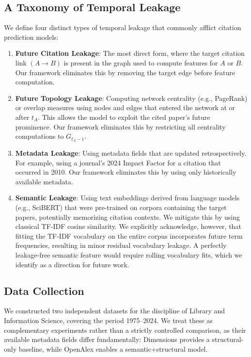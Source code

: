 \documentclass[11pt,a4paper]{article}
\begin{document}
\subsection{A Taxonomy of Temporal Leakage}
We define four distinct types of temporal leakage that commonly afflict citation prediction models:

\begin{enumerate}
    \item \textbf{Future Citation Leakage}: The most direct form, where the target citation link $(A \to B)$ is present in the graph used to compute features for $A$ or $B$. Our framework eliminates this by removing the target edge before feature computation.
    \item \textbf{Future Topology Leakage}: Computing network centrality (e.g., PageRank) or overlap measures using nodes and edges that entered the network at or after $t_A$. This allows the model to exploit the cited paper's future prominence. Our framework eliminates this by restricting all centrality computations to $G_{t_A-1}$.
    \item \textbf{Metadata Leakage}: Using metadata fields that are updated retrospectively. For example, using a journal's 2024 Impact Factor for a citation that occurred in 2010. Our framework eliminates this by using only historically available metadata.
    \item \textbf{Semantic Leakage}: Using text embeddings derived from language models (e.g., SciBERT) that were pre-trained on corpora containing the target papers, potentially memorizing citation contexts. We mitigate this by using classical TF-IDF cosine similarity. We explicitly acknowledge, however, that fitting the TF-IDF vocabulary on the entire corpus incorporates future term frequencies, resulting in minor residual vocabulary leakage. A perfectly leakage-free semantic feature would require rolling vocabulary fits, which we identify as a direction for future work.
\end{enumerate}

\subsection{Data Collection}
We constructed two independent datasets for the discipline of Library and Information Science, covering the period 1975--2024. We treat these as complementary experiments rather than a strictly controlled comparison, as their available metadata fields differ fundamentally: Dimensions provides a structural-only baseline, while OpenAlex enables a semantic+structural model.
\end{document}
